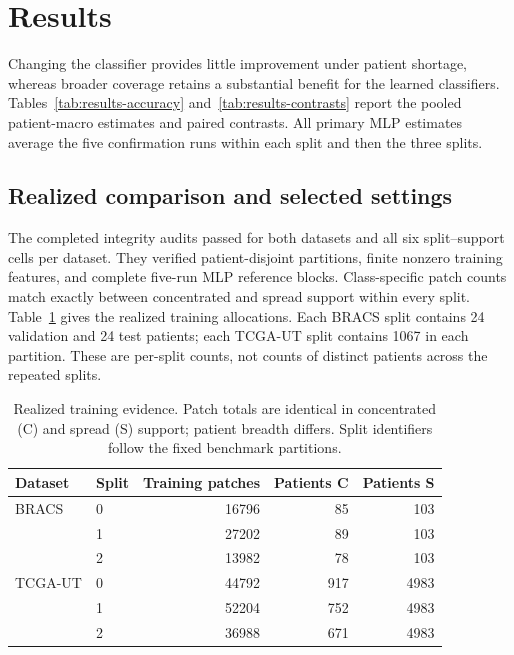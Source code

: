 \section{Results}
\label{sec:results}
Changing the classifier provides little improvement under patient shortage, whereas broader coverage retains a substantial benefit for the learned classifiers. Tables~\ref{tab:results-accuracy} and~\ref{tab:results-contrasts} report the pooled patient-macro estimates and paired contrasts. All primary MLP estimates average the five confirmation runs within each split and then the three splits.

\subsection{Realized comparison and selected settings}
The completed integrity audits passed for both datasets and all six split--support cells per dataset. They verified patient-disjoint partitions, finite nonzero training features, and complete five-run MLP reference blocks. Class-specific patch counts match exactly between concentrated and spread support within every split. Table~\ref{tab:realized-support} gives the realized training allocations. Each BRACS split contains 24 validation and 24 test patients; each TCGA-UT split contains \num{1067} in each partition. These are per-split counts, not counts of distinct patients across the repeated splits.

\begin{table}[htbp]
\centering\small
\begin{tabular}{@{}llrrr@{}}
\toprule
Dataset & Split & Training patches & Patients C & Patients S \\
\midrule
BRACS & 0 & \num{16796} & 85 & 103 \\
 & 1 & \num{27202} & 89 & 103 \\
 & 2 & \num{13982} & 78 & 103 \\
\addlinespace
TCGA-UT & 0 & \num{44792} & 917 & \num{4983} \\
 & 1 & \num{52204} & 752 & \num{4983} \\
 & 2 & \num{36988} & 671 & \num{4983} \\
\bottomrule
\end{tabular}
\caption{Realized training evidence. Patch totals are identical in concentrated (C) and spread (S) support; patient breadth differs. Split identifiers follow the fixed benchmark partitions.}
\label{tab:realized-support}
\end{table}

